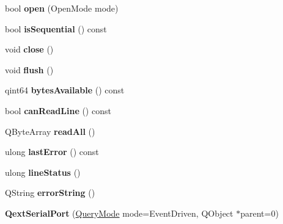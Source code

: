 \begin{DoxyCompactItemize}
\item 
\mbox{\label{class_qext_serial_port_a2afbc8095ef88403b74378933332d287}} 
bool {\bfseries open} (Open\+Mode mode)
\item 
\mbox{\label{class_qext_serial_port_a4174ec4c484016e26eaea53edd252e26}} 
bool {\bfseries is\+Sequential} () const
\item 
\mbox{\label{class_qext_serial_port_a5ae591df94fc66ccb85cbb6565368bca}} 
void {\bfseries close} ()
\item 
\mbox{\label{class_qext_serial_port_adac116554b543b7c4228c018a85882f5}} 
void {\bfseries flush} ()
\item 
\mbox{\label{class_qext_serial_port_ada77ba7eed0c66635d6d856e43d30556}} 
qint64 {\bfseries bytes\+Available} () const
\item 
\mbox{\label{class_qext_serial_port_a05b7cf4fc998401b7cf8a8851fdd7a02}} 
bool {\bfseries can\+Read\+Line} () const
\item 
\mbox{\label{class_qext_serial_port_a3b6261ecdae0766f83d351e39be9130d}} 
Q\+Byte\+Array {\bfseries read\+All} ()
\item 
\mbox{\label{class_qext_serial_port_a90581222a3c66b51c3a93e4e912a736b}} 
ulong {\bfseries last\+Error} () const
\item 
\mbox{\label{class_qext_serial_port_a60edafdd0f10131c59081b3d45ee6e83}} 
ulong {\bfseries line\+Status} ()
\item 
\mbox{\label{class_qext_serial_port_af799a7684337babb971e2e0d8cda7cf1}} 
Q\+String {\bfseries error\+String} ()
\item 
\mbox{\label{class_qext_serial_port_af9bd56447247a8f2b561592f53cf063f}} 
{\bfseries Qext\+Serial\+Port} (\mbox{\hyperlink{class_qext_serial_port_a269e1f3656224a10c321bd70ab89cf64}{Query\+Mode}} mode=Event\+Driven, Q\+Object $\ast$parent=0)

\end{DoxyCompactItemize}

